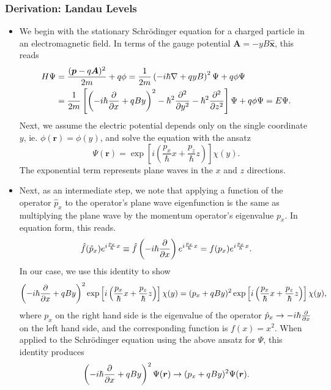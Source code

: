 \documentclass[11pt, a4paper]{article}
\renewcommand{\grad}{\nabla}
\newcommand{\Schro}{Schr\"{o}dinger\xspace}
\renewcommand{\vec}[1]{\bm{#1}}  %
\newcommand{\uvec}[1]{\hat{\vec{#1}}}  %
\renewcommand{\r}{\vec{r}}  %
\newcommand{\A}{\vec{A}}  %
\renewcommand{\P}{\Psi}  %
\begin{document}
\subsubsection{Derivation: Landau Levels}
\begin{itemize}
	
	\item We begin with the stationary \Schro equation for a charged particle in an electromagnetic field. In terms of the gauge potential $ \A = - y B \uvec{x} $, this reads
	\begin{align*}
		H\P &= \frac{(\vec{p} - q\A)^{2}}{2m} + q \phi = \frac{1}{2m} \left(-i\hbar \grad + qyB \right)^{2}\P + q \phi \P \\
		&  =\frac{1}{2m}\left[\left(-i\hbar \pdv{x} + qBy\right)^{2} - \hbar^{2}\pdv[2]{}{y} - \hbar^{2}\pdv[2]{}{z}\right]\P + q\phi \P = E \P.
	\end{align*}
	Next, we assume the electric potential depends only on the single coordinate $ y $, ie. $ \phi(\r) = \phi(y) $, and solve the equation with the ansatz
	\begin{equation*}
		\P(\r) = \exp\left[i \left(\frac{p_{x}}{\hbar}x + \frac{p_{z}}{\hbar}z \right)\right]\chi(y).
	\end{equation*}
	The exponential term represents plane waves in the $ x $ and $ z $ directions.
	
	\item Next, as an intermediate step, we note that applying a function of the operator $ \hat{p}_{x} $ to the operator's plane wave eigenfunction is the same as multiplying the plane wave by the momentum operator's eigenvalue $ p_{x} $. In equation form, this reads. 
	\begin{equation*}
		\hat{f}(\hat{p}_{x})e^{i\frac{p_{x}}{\hbar}x} \equiv  \hat{f}\left(-i\hbar \pdv{x}\right)e^{i\frac{p_{x}}{\hbar}x} = f(p_{x}) e^{i\frac{p_{x}}{\hbar}x}.
	\end{equation*}
	In our case, we use this identity to show
	\begin{align*}
		\left(-i\hbar \pdv{x} + qBy\right)^{2}\exp\left[i \left(\frac{p_{x}}{\hbar}x + \frac{p_{z}}{\hbar}z \right)\right]\chi(y) = (p_{x} + qBy)^{2}\exp\left[i \left(\frac{p_{x}}{\hbar}x + \frac{p_{z}}{\hbar}z \right)\right]\chi(y),
	\end{align*}
	where $ p_{x} $ on the right hand side is the eigenvalue of the operator $ \hat{p}_{x} \to -i\hbar \pdv{x}$ on the left hand side, and the corresponding function is $ f(x) = x^{2} $. When applied to the \Schro equation using the above ansatz for $ \P $, this identity produces
   \begin{equation*}
       \left(-i\hbar \pdv{x} + qBy\right)^{2} \P(\r) \to (p_{x} + qBy)^{2} \P(\r).
   \end{equation*}
   

\end{itemize}
\end{document}
